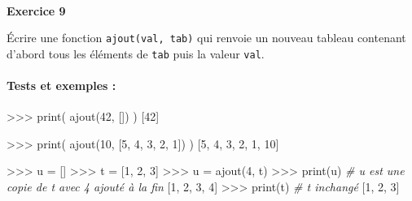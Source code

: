 \documentclass[a4paper,17pt]{extarticle}
\newenvironment{eleve}%
{\begin{activite}\color{noiramu}\\[-0.5cm]}
{\end{activite}}
\newenvironment{Shaded}{}{}
\newcommand{\DecValTok}[1]{\textcolor[rgb]{0.25,0.63,0.44}{{#1}}}
\newcommand{\CommentTok}[1]{\textcolor[rgb]{0.38,0.63,0.69}{\textit{{#1}}}}
\newcommand{\NormalTok}[1]{{#1}}
\newcommand{\OperatorTok}[1]{\textcolor[rgb]{0.40,0.40,0.40}{{#1}}}
\newcommand{\BuiltInTok}[1]{{#1}}
\begin{document}
\begin{eleve}
    \textbf{Exercice 9}

Écrire une fonction \texttt{ajout(val,\ tab)} qui renvoie un nouveau
tableau contenant d'abord tous les éléments de \texttt{tab} puis la
valeur \texttt{val}.

\hypertarget{tests-et-exemples}{%
\paragraph{Tests et exemples :}\label{tests-et-exemples}}

\begin{Shaded}
\begin{Highlighting}[]
\OperatorTok{\textgreater{}\textgreater{}\textgreater{}} \BuiltInTok{print}\NormalTok{( ajout(}\DecValTok{42}\NormalTok{, []) )}
\NormalTok{[}\DecValTok{42}\NormalTok{]}

\OperatorTok{\textgreater{}\textgreater{}\textgreater{}} \BuiltInTok{print}\NormalTok{( ajout(}\DecValTok{10}\NormalTok{, [}\DecValTok{5}\NormalTok{, }\DecValTok{4}\NormalTok{, }\DecValTok{3}\NormalTok{, }\DecValTok{2}\NormalTok{, }\DecValTok{1}\NormalTok{]) )}
\NormalTok{[}\DecValTok{5}\NormalTok{, }\DecValTok{4}\NormalTok{, }\DecValTok{3}\NormalTok{, }\DecValTok{2}\NormalTok{, }\DecValTok{1}\NormalTok{, }\DecValTok{10}\NormalTok{]}

\OperatorTok{\textgreater{}\textgreater{}\textgreater{}}\NormalTok{ u }\OperatorTok{=}\NormalTok{ []}
\OperatorTok{\textgreater{}\textgreater{}\textgreater{}}\NormalTok{ t }\OperatorTok{=}\NormalTok{ [}\DecValTok{1}\NormalTok{, }\DecValTok{2}\NormalTok{, }\DecValTok{3}\NormalTok{]}
\OperatorTok{\textgreater{}\textgreater{}\textgreater{}}\NormalTok{ u }\OperatorTok{=}\NormalTok{ ajout(}\DecValTok{4}\NormalTok{, t)}
\OperatorTok{\textgreater{}\textgreater{}\textgreater{}} \BuiltInTok{print}\NormalTok{(u)        }\CommentTok{\# u est une copie de t avec 4 ajouté à la fin}
\NormalTok{[}\DecValTok{1}\NormalTok{, }\DecValTok{2}\NormalTok{, }\DecValTok{3}\NormalTok{, }\DecValTok{4}\NormalTok{]}
\OperatorTok{\textgreater{}\textgreater{}\textgreater{}} \BuiltInTok{print}\NormalTok{(t)        }\CommentTok{\# t inchangé}
\NormalTok{[}\DecValTok{1}\NormalTok{, }\DecValTok{2}\NormalTok{, }\DecValTok{3}\NormalTok{]}
\end{Highlighting}
\end{Shaded}
        
        \end{eleve}
\end{document}

